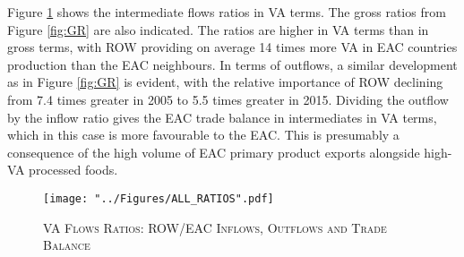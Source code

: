 \documentclass[a4paper]{article}
\begin{document}
Figure \ref{fig:TBint} shows the intermediate flows ratios in VA terms. The gross ratios from Figure \ref{fig:GR} are also indicated.  %
The ratios are higher in VA terms than in gross terms, with ROW providing on average 14 times more VA in EAC countries production than the EAC neighbours. In terms of outflows, a similar development as in Figure \ref{fig:GR} is evident, with the relative importance of ROW declining from 7.4 times greater in 2005 to 5.5 times greater in 2015. Dividing the outflow by the inflow ratio gives the EAC trade balance in intermediates in VA terms, which in this case is more favourable to the EAC. This is presumably a consequence of the high volume of EAC primary product exports alongside high-VA processed foods.  %

\begin{figure}[h!]
\centering
\caption{\label{fig:TBint}\textsc{VA Flows Ratios: ROW/EAC Inflows, Outflows and Trade Balance}}
\texttt{[image: "../Figures/ALL\_RATIOS".pdf]} %
\end{figure}
\FloatBarrier

\end{document}
